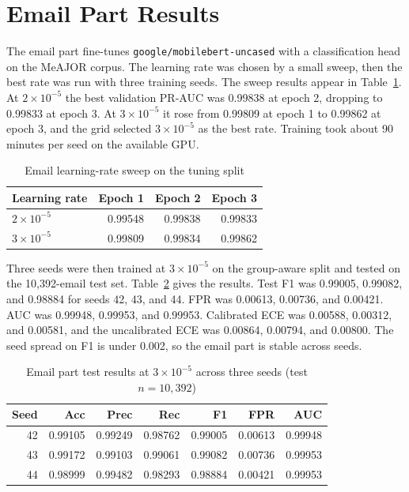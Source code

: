 \documentclass{FastFyp}
\begin{document}
\section{Email Part Results}
\label{sec:email-results}

The email part fine-tunes \texttt{google/mobilebert-uncased} with a classification head on the MeAJOR corpus. The learning rate was chosen by a small sweep, then the best rate was run with three training seeds. The sweep results appear in Table~\ref{tab:email-lr}. At $2\times10^{-5}$ the best validation PR-AUC was 0.99838 at epoch 2, dropping to 0.99833 at epoch 3. At $3\times10^{-5}$ it rose from 0.99809 at epoch 1 to 0.99862 at epoch 3, and the grid selected $3\times10^{-5}$ as the best rate. Training took about 90 minutes per seed on the available GPU.

\begin{table}[htbp]
\centering
\caption{Email learning-rate sweep on the tuning split}
\label{tab:email-lr}
\begin{tabular}{lrrr}
\hline
Learning rate & Epoch 1 & Epoch 2 & Epoch 3 \\
\hline
$2\times10^{-5}$ & 0.99548 & 0.99838 & 0.99833 \\
$3\times10^{-5}$ & 0.99809 & 0.99834 & 0.99862 \\
\hline
\end{tabular}
\end{table}

Three seeds were then trained at $3\times10^{-5}$ on the group-aware split and tested on the 10{,}392-email test set. Table~\ref{tab:email-seeds} gives the results. Test F1 was 0.99005, 0.99082, and 0.98884 for seeds 42, 43, and 44. FPR was 0.00613, 0.00736, and 0.00421. AUC was 0.99948, 0.99953, and 0.99953. Calibrated ECE was 0.00588, 0.00312, and 0.00581, and the uncalibrated ECE was 0.00864, 0.00794, and 0.00800. The seed spread on F1 is under 0.002, so the email part is stable across seeds.

\begin{table}[htbp]
\centering
\caption{Email part test results at $3\times10^{-5}$ across three seeds (test $n=10{,}392$)}
\label{tab:email-seeds}
\begin{tabular}{rrrrrrr}
\hline
Seed & Acc & Prec & Rec & F1 & FPR & AUC \\
\hline
42 & 0.99105 & 0.99249 & 0.98762 & 0.99005 & 0.00613 & 0.99948 \\
43 & 0.99172 & 0.99103 & 0.99061 & 0.99082 & 0.00736 & 0.99953 \\
44 & 0.98999 & 0.99482 & 0.98293 & 0.98884 & 0.00421 & 0.99953 \\
\hline
\end{tabular}
\end{table}
\end{document}
